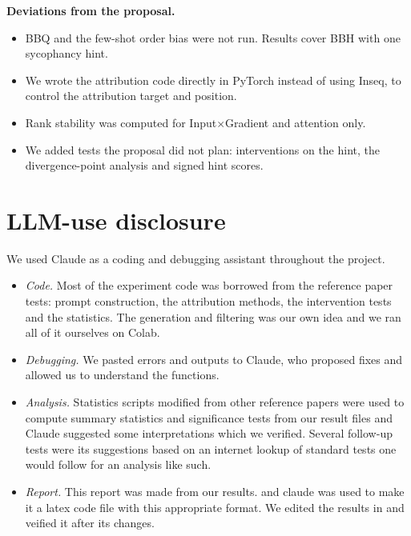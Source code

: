 \documentclass[10pt,a4paper,twocolumn]{article}
\newcommand{\ixg}{Input$\times$Gradient}
\newcommand{\para}[1]{\textbf{#1}}
\begin{document}
\para{Deviations from the proposal.}
\begin{itemize}
\item BBQ and the few-shot order bias were not run. Results cover BBH with one sycophancy hint.
\item We wrote the attribution code directly in PyTorch instead of using Inseq, to control the attribution target and position.
\item Rank stability was computed for \ixg{} and attention only.
\item We added tests the proposal did not plan: interventions on the hint, the divergence-point analysis and signed hint scores.
\end{itemize}

\section{LLM-use disclosure}
\label{app:llm}

We used Claude as a coding and debugging assistant throughout the project.
\begin{itemize}
\item \emph{Code.} Most of the experiment code was borrowed from the reference paper tests: prompt construction, the attribution methods, the intervention tests and the statistics. The generation and filtering was our own idea and we ran all of it ourselves on Colab.
\item \emph{Debugging.} We pasted errors and outputs to Claude, who proposed fixes and allowed us to understand the functions.
\item \emph{Analysis.} Statistics scripts modified from other reference papers were used to compute summary statistics and significance tests from our result files and Claude suggested some interpretations which we verified. Several follow-up tests were its suggestions based on an internet lookup of standard tests one would follow for an analysis like such.
\item \emph{Report.} This report was made from our results. and claude was used to make it a latex code file with this appropriate format. We edited the results in and veified it after its changes.
\end{itemize}
\end{document}
